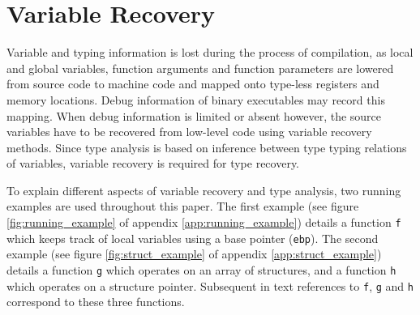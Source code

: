 
\section{Variable Recovery}

Variable and typing information is lost during the process of compilation, as local and global variables, function arguments and function parameters are lowered from source code to machine code and mapped onto type-less registers and memory locations. Debug information of binary executables may record this mapping. When debug information is limited or absent however, the source variables have to be recovered from low-level code using variable recovery methods. Since type analysis is based on inference between type typing relations of variables, variable recovery is required for type recovery.

To explain different aspects of variable recovery and type analysis, two running examples are used throughout this paper. The first example (see figure \ref{fig:running_example} of appendix \ref{app:running_example}) details a function \texttt{f} which keeps track of local variables using a base pointer (\texttt{ebp}). The second example (see figure \ref{fig:struct_example} of appendix \ref{app:struct_example}) details a function \texttt{g} which operates on an array of structures, and a function \texttt{h} which operates on a structure pointer. Subsequent in text references to \texttt{f}, \texttt{g} and \texttt{h} correspond to these three functions.




